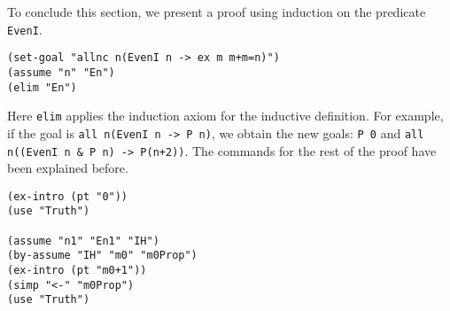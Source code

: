 \documentclass[12pt]{amsart}
\begin{document}
To conclude this section, we present a proof using induction on the
predicate \texttt{EvenI}.
\begin{verbatim}
(set-goal "allnc n(EvenI n -> ex m m+m=n)")
(assume "n" "En")
(elim "En")
\end{verbatim}
Here \texttt{elim} applies the induction
axiom for the inductive definition.  For example, if the goal is
\texttt{all n(EvenI n -> P n)}, we obtain the new goals: \texttt{P 0}
and \texttt{all n((EvenI n \& P n) -> P(n+2))}.  The commands for the
rest of the proof have been explained before.
\begin{verbatim}
(ex-intro (pt "0"))
(use "Truth")

(assume "n1" "En1" "IH")
(by-assume "IH" "m0" "m0Prop")
(ex-intro (pt "m0+1"))
(simp "<-" "m0Prop")
(use "Truth")
\end{verbatim}

\end{document}
